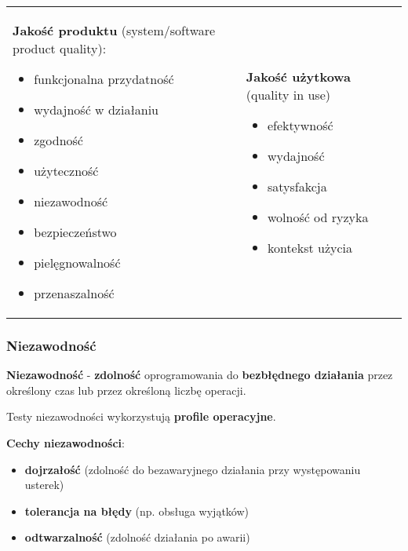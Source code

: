 \documentclass[../main.tex]{subfiles}
\begin{document}
    \begin{table}[H]
        \begin{center}
            \begin{tabular}{p{8cm} p{8cm}}
                \textbf{ Jakość produktu} (system/software product quality):
                \begin{itemize}
                    \item funkcjonalna przydatność
                    \item wydajność w działaniu
                    \item zgodność
                    \item użyteczność
                    \item niezawodność
                    \item bezpieczeństwo
                    \item pielęgnowalność
                    \item przenaszalność
                \end{itemize}
                &
                \textbf{Jakość użytkowa} (quality in use)
                \begin{itemize}
                    \item efektywność
                    \item wydajność
                    \item satysfakcja
                    \item wolność od ryzyka
                    \item kontekst użycia
                \end{itemize}
            \end{tabular}
        \end{center}
    \end{table}


    \subsubsection{Niezawodność}

    \textbf{Niezawodność} - \textbf{zdolność} oprogramowania do \textbf{bezbłędnego działania} przez określony czas lub przez określoną
    liczbę operacji.

    Testy niezawodności wykorzystują \textbf{profile operacyjne}.

    \textbf{Cechy niezawodności}:
    \begin{itemize}
        \item \textbf{dojrzałość} (zdolność do bezawaryjnego działania przy występowaniu usterek)
        \item \textbf{tolerancja na błędy} (np. obsługa wyjątków)
        \item \textbf{odtwarzalność} (zdolność działania po awarii)
    \end{itemize}
\end{document}
